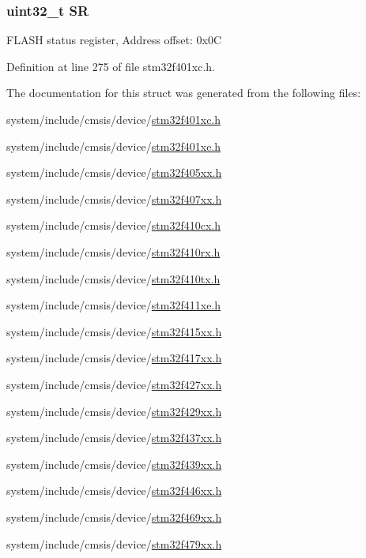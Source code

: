 \subsubsection[{\texorpdfstring{SR}{SR}}]{ uint32\+\_\+t SR}\hypertarget{struct_f_l_a_s_h___type_def_af6aca2bbd40c0fb6df7c3aebe224a360}{}\label{struct_f_l_a_s_h___type_def_af6aca2bbd40c0fb6df7c3aebe224a360}
F\+L\+A\+SH status register, Address offset\+: 0x0C 

Definition at line 275 of file stm32f401xc.\+h.



The documentation for this struct was generated from the following files\+:\begin{DoxyCompactItemize}
\item 
system/include/cmsis/device/\hyperlink{stm32f401xc_8h}{stm32f401xc.\+h}\item 
system/include/cmsis/device/\hyperlink{stm32f401xe_8h}{stm32f401xe.\+h}\item 
system/include/cmsis/device/\hyperlink{stm32f405xx_8h}{stm32f405xx.\+h}\item 
system/include/cmsis/device/\hyperlink{stm32f407xx_8h}{stm32f407xx.\+h}\item 
system/include/cmsis/device/\hyperlink{stm32f410cx_8h}{stm32f410cx.\+h}\item 
system/include/cmsis/device/\hyperlink{stm32f410rx_8h}{stm32f410rx.\+h}\item 
system/include/cmsis/device/\hyperlink{stm32f410tx_8h}{stm32f410tx.\+h}\item 
system/include/cmsis/device/\hyperlink{stm32f411xe_8h}{stm32f411xe.\+h}\item 
system/include/cmsis/device/\hyperlink{stm32f415xx_8h}{stm32f415xx.\+h}\item 
system/include/cmsis/device/\hyperlink{stm32f417xx_8h}{stm32f417xx.\+h}\item 
system/include/cmsis/device/\hyperlink{stm32f427xx_8h}{stm32f427xx.\+h}\item 
system/include/cmsis/device/\hyperlink{stm32f429xx_8h}{stm32f429xx.\+h}\item 
system/include/cmsis/device/\hyperlink{stm32f437xx_8h}{stm32f437xx.\+h}\item 
system/include/cmsis/device/\hyperlink{stm32f439xx_8h}{stm32f439xx.\+h}\item 
system/include/cmsis/device/\hyperlink{stm32f446xx_8h}{stm32f446xx.\+h}\item 
system/include/cmsis/device/\hyperlink{stm32f469xx_8h}{stm32f469xx.\+h}\item 
system/include/cmsis/device/\hyperlink{stm32f479xx_8h}{stm32f479xx.\+h}\end{DoxyCompactItemize}
